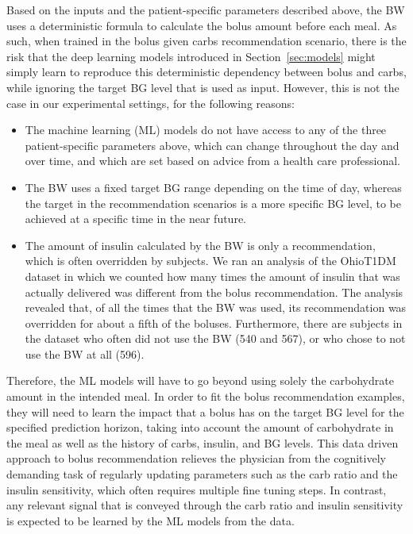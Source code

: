 \documentclass[journal,article,submit,moreauthors,pdftex]{Definitions/mdpi}
\begin{document}
Based on the inputs and the patient-specific parameters described above, the BW uses a deterministic formula to calculate the bolus amount before each meal. As such, when trained in the bolus given carbs recommendation scenario, there is the risk that the deep learning models introduced in Section~\ref{sec:models} might simply learn to reproduce this deterministic dependency between bolus and carbs, while ignoring the target BG level that is used as input. However, this is not the case in our experimental settings, for the following reasons:
\begin{itemize}
    \item The machine learning (ML) models do not have access to any of the three patient-specific parameters above, which can change throughout the day and over time, and which are set based on advice from a health care professional.
    \item The BW uses a fixed target BG range depending on the time of day, whereas the target in the recommendation scenarios is a more specific BG level, to be achieved at a specific time in the near future.
    \item The amount of insulin calculated by the BW is only a recommendation, which is often overridden by subjects. We ran an analysis of the OhioT1DM dataset in which we counted how many times the amount of insulin that was actually delivered was different from the bolus recommendation. The analysis revealed that, of all the times that the BW was used, its recommendation was overridden for about a fifth of the boluses. Furthermore, there are subjects in the dataset who often did not use the BW (540 and 567), or who 
    chose to not use the BW at all (596).
\end{itemize}
Therefore, the ML models will have to go beyond using solely the carbohydrate amount in the intended meal. In order to fit the bolus recommendation examples, they will need to learn the impact that a bolus has on the target BG level for the specified prediction horizon, taking into account the amount of carbohydrate in the meal as well as the history of carbs, insulin, and BG levels. This data driven approach to bolus recommendation relieves the physician from the cognitively demanding task of regularly updating parameters such as the carb ratio and the insulin sensitivity, which often requires multiple fine tuning steps. In contrast, any relevant signal that is conveyed through the carb ratio and insulin sensitivity is expected to be learned by the ML models from the data.
\end{document}
